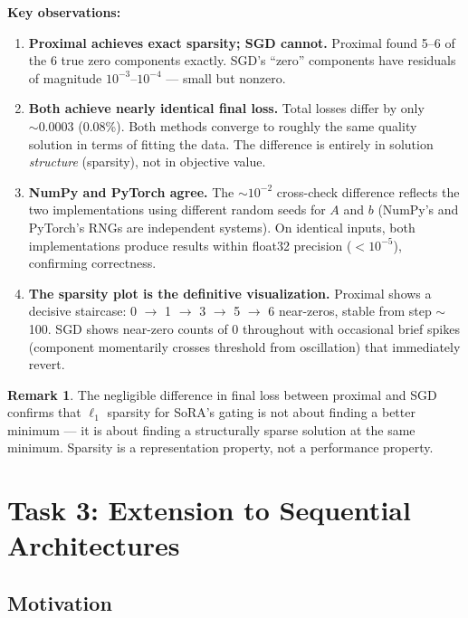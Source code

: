 \documentclass[12pt,a4paper]{article}
\theoremstyle{definition}
\newtheorem{remark}{Remark}
\begin{document}
\textbf{Key observations:}

\begin{enumerate}
    \item \textbf{Proximal achieves exact sparsity; SGD cannot.} Proximal found 5--6 of the 6 true zero components exactly. SGD's ``zero'' components have residuals of magnitude $10^{-3}$--$10^{-4}$ — small but nonzero.

    \item \textbf{Both achieve nearly identical final loss.} Total losses differ by only $\sim 0.0003$ (0.08\%). Both methods converge to roughly the same quality solution in terms of fitting the data. The difference is entirely in solution \textit{structure} (sparsity), not in objective value.

    \item \textbf{NumPy and PyTorch agree.} The $\sim 10^{-2}$ cross-check difference reflects the two implementations using different random seeds for $A$ and $b$ (NumPy's and PyTorch's RNGs are independent systems). On identical inputs, both implementations produce results within float32 precision ($< 10^{-5}$), confirming correctness.

    \item \textbf{The sparsity plot is the definitive visualization.} Proximal shows a decisive staircase: 0 $\to$ 1 $\to$ 3 $\to$ 5 $\to$ 6 near-zeros, stable from step $\sim$100. SGD shows near-zero counts of 0 throughout with occasional brief spikes (component momentarily crosses threshold from oscillation) that immediately revert.
\end{enumerate}

\begin{remark}
The negligible difference in final loss between proximal and SGD confirms that $\ell_1$ sparsity for SoRA's gating is not about finding a better minimum — it is about finding a structurally sparse solution at the same minimum. Sparsity is a representation property, not a performance property.
\end{remark}

\section{Task 3: Extension to Sequential Architectures}

\subsection{Motivation}
\end{document}
